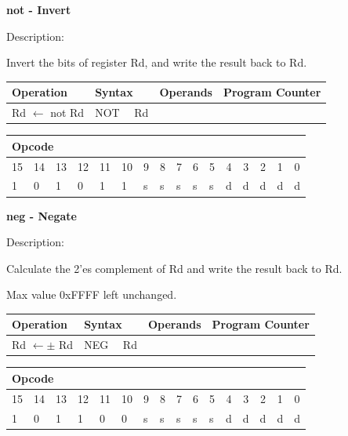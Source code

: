 \documentclass[%
	pdftex,
	a4paper,
	oneside,
	bibtotoc,%
	idxtotoc,%
	bibtotocnumbered,
	halfparskip,%
]{scrbook}
\begin{document}
\bigskip

\textbf{not - Invert }

Description:

Invert the bits of register Rd, and write the result back to Rd.

\begin{tabular}{|l|l|l|l|}
\hline
Operation & Syntax & Operands & Program Counter \\ \hline
Rd $\leftarrow $ not Rd & NOT \ \ Rd &  &  \\ \hline
\end{tabular}

\begin{tabular}{|c|c|c|c|c|c|c|c|c|c|c|c|c|c|c|c|}
\hline
\multicolumn{6}{|l|}{Opcode} & \multicolumn{5}{|l|}{} & \multicolumn{5}{|l|}{
} \\ \hline
15 & 14 & 13 & 12 & 11 & 10 & 9 & 8 & 7 & 6 & 5 & 4 & 3 & 2 & 1 & 0 \\ \hline
\multicolumn{1}{|l|}{1} & \multicolumn{1}{|l|}{0} & \multicolumn{1}{|l|}{1}
& \multicolumn{1}{|l|}{0} & \multicolumn{1}{|l|}{1} & \multicolumn{1}{|l|}{1}
& \multicolumn{1}{|l|}{s} & \multicolumn{1}{|l|}{s} & \multicolumn{1}{|l|}{s}
& \multicolumn{1}{|l|}{s} & \multicolumn{1}{|l|}{s} & \multicolumn{1}{|l|}{d}
& \multicolumn{1}{|l|}{d} & \multicolumn{1}{|l|}{d} & \multicolumn{1}{|l|}{d}
& \multicolumn{1}{|l|}{d} \\ \hline
\end{tabular}

\bigskip

\textbf{neg - Negate}

Description:

Calculate the 2'es complement of Rd and write the result back to Rd.

Max value 0xFFFF left unchanged.

\begin{tabular}{|l|l|l|l|}
\hline
Operation & Syntax & Operands & Program Counter \\ \hline
Rd $\leftarrow \pm $ Rd & NEG \ \ Rd &  &  \\ \hline
\end{tabular}

\begin{tabular}{|c|c|c|c|c|c|c|c|c|c|c|c|c|c|c|c|}
\hline
\multicolumn{6}{|l|}{Opcode} & \multicolumn{5}{|l|}{} & \multicolumn{5}{|l|}{
} \\ \hline
15 & 14 & 13 & 12 & 11 & 10 & 9 & 8 & 7 & 6 & 5 & 4 & 3 & 2 & 1 & 0 \\ \hline
\multicolumn{1}{|l|}{1} & \multicolumn{1}{|l|}{0} & \multicolumn{1}{|l|}{1}
& \multicolumn{1}{|l|}{1} & \multicolumn{1}{|l|}{0} & \multicolumn{1}{|l|}{0}
& \multicolumn{1}{|l|}{s} & \multicolumn{1}{|l|}{s} & \multicolumn{1}{|l|}{s}
& \multicolumn{1}{|l|}{s} & \multicolumn{1}{|l|}{s} & \multicolumn{1}{|l|}{d}
& \multicolumn{1}{|l|}{d} & \multicolumn{1}{|l|}{d} & \multicolumn{1}{|l|}{d}
& \multicolumn{1}{|l|}{d} \\ \hline
\end{tabular}
\end{document}
